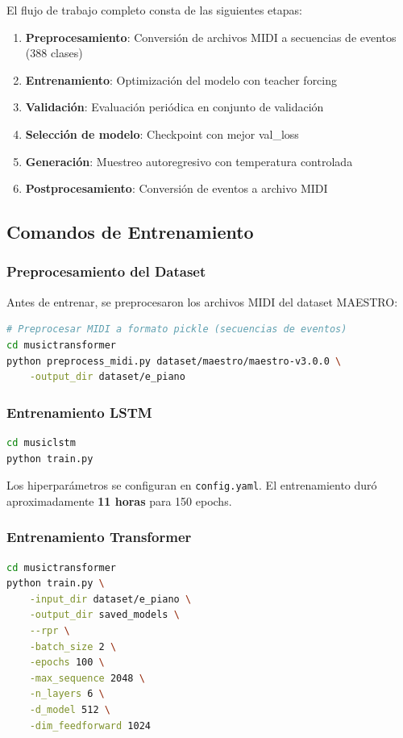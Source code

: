 \documentclass[12pt,a4paper]{article}
\begin{document}
El flujo de trabajo completo consta de las siguientes etapas:

\begin{enumerate}
    \item \textbf{Preprocesamiento}: Conversión de archivos MIDI a secuencias de eventos (388 clases)
    \item \textbf{Entrenamiento}: Optimización del modelo con teacher forcing
    \item \textbf{Validación}: Evaluación periódica en conjunto de validación
    \item \textbf{Selección de modelo}: Checkpoint con mejor val\_loss
    \item \textbf{Generación}: Muestreo autoregresivo con temperatura controlada
    \item \textbf{Postprocesamiento}: Conversión de eventos a archivo MIDI
\end{enumerate}

\subsection{Comandos de Entrenamiento}

\subsubsection{Preprocesamiento del Dataset}
Antes de entrenar, se preprocesaron los archivos MIDI del dataset MAESTRO:

\begin{lstlisting}[language=bash]
# Preprocesar MIDI a formato pickle (secuencias de eventos)
cd musictransformer
python preprocess_midi.py dataset/maestro/maestro-v3.0.0 \
    -output_dir dataset/e_piano
\end{lstlisting}

\subsubsection{Entrenamiento LSTM}
\begin{lstlisting}[language=bash]
cd musiclstm
python train.py
\end{lstlisting}

Los hiperparámetros se configuran en \texttt{config.yaml}. El entrenamiento duró aproximadamente \textbf{11 horas} para 150 epochs.

\subsubsection{Entrenamiento Transformer}
\begin{lstlisting}[language=bash]
cd musictransformer
python train.py \
    -input_dir dataset/e_piano \
    -output_dir saved_models \
    --rpr \
    -batch_size 2 \
    -epochs 100 \
    -max_sequence 2048 \
    -n_layers 6 \
    -d_model 512 \
    -dim_feedforward 1024
\end{lstlisting}
\end{document}
